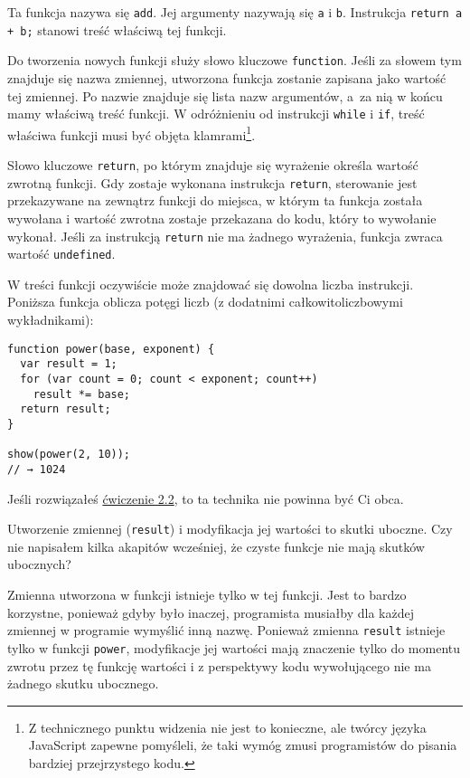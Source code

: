 Ta funkcja nazywa się \texttt{add}. Jej argumenty nazywają się \texttt{a} i \texttt{b}. Instrukcja \texttt{return a + b;} stanowi treść właściwą tej funkcji.

    
Do tworzenia nowych funkcji służy słowo kluczowe \texttt{function}. Jeśli za słowem tym znajduje się nazwa zmiennej, utworzona funkcja zostanie zapisana jako wartość tej zmiennej. Po nazwie znajduje się lista nazw argumentów, a~za nią w końcu mamy właściwą treść funkcji. W odróżnieniu od instrukcji \texttt{while} i \texttt{if}, treść właściwa funkcji musi być objęta klamrami\footnote{Z technicznego punktu widzenia nie jest to konieczne, ale twórcy języka JavaScript zapewne pomyśleli, że taki wymóg zmusi programistów do pisania bardziej przejrzystego kodu.}.

    
Słowo kluczowe \texttt{return}, po którym znajduje się wyrażenie określa wartość zwrotną funkcji. Gdy zostaje wykonana instrukcja \texttt{return}, sterowanie jest przekazywane na zewnątrz funkcji do miejsca, w którym ta funkcja została wywołana i wartość zwrotna zostaje przekazana do kodu, który to wywołanie wykonał. Jeśli za instrukcją \texttt{return} nie ma żadnego wyrażenia, funkcja zwraca wartość \texttt{undefined}.

    
W treści funkcji oczywiście może znajdować się dowolna liczba instrukcji. Poniższa funkcja oblicza potęgi liczb (z dodatnimi całkowitoliczbowymi wykładnikami):

    
\begin{verbatim} 
function power(base, exponent) {
  var result = 1;
  for (var count = 0; count < exponent; count++)
    result *= base;
  return result;
}

show(power(2, 10));
// → 1024
\end{verbatim}
    
Jeśli rozwiązałeś \hyperref[sec:2.2]{ćwiczenie 2.2}, to ta technika nie powinna być Ci obca.

    
Utworzenie zmiennej (\texttt{result}) i modyfikacja jej wartości to skutki uboczne. Czy nie napisałem kilka akapitów wcześniej, że czyste funkcje nie mają skutków ubocznych?

    
Zmienna utworzona w funkcji istnieje tylko w tej funkcji. Jest to bardzo korzystne, ponieważ gdyby było inaczej, programista musiałby dla każdej zmiennej w programie wymyślić inną nazwę. Ponieważ zmienna \texttt{result} istnieje tylko w funkcji \texttt{power}, modyfikacje jej wartości mają znaczenie tylko do momentu zwrotu przez tę funkcję wartości i z perspektywy kodu wywołującego nie ma żadnego skutku ubocznego.

